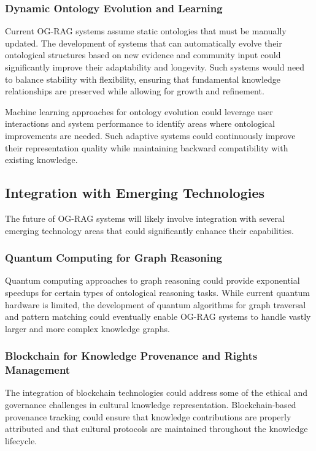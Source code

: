 \subsubsection{Dynamic Ontology Evolution and Learning}

Current OG-RAG systems assume static ontologies that must be manually updated. The development of systems that can automatically evolve their ontological structures based on new evidence and community input could significantly improve their adaptability and longevity. Such systems would need to balance stability with flexibility, ensuring that fundamental knowledge relationships are preserved while allowing for growth and refinement.

Machine learning approaches for ontology evolution could leverage user interactions and system performance to identify areas where ontological improvements are needed. Such adaptive systems could continuously improve their representation quality while maintaining backward compatibility with existing knowledge.

\subsection{Integration with Emerging Technologies}

The future of OG-RAG systems will likely involve integration with several emerging technology areas that could significantly enhance their capabilities.

\subsubsection{Quantum Computing for Graph Reasoning}

Quantum computing approaches to graph reasoning could provide exponential speedups for certain types of ontological reasoning tasks. While current quantum hardware is limited, the development of quantum algorithms for graph traversal and pattern matching could eventually enable OG-RAG systems to handle vastly larger and more complex knowledge graphs.

\subsubsection{Blockchain for Knowledge Provenance and Rights Management}

The integration of blockchain technologies could address some of the ethical and governance challenges in cultural knowledge representation. Blockchain-based provenance tracking could ensure that knowledge contributions are properly attributed and that cultural protocols are maintained throughout the knowledge lifecycle.

